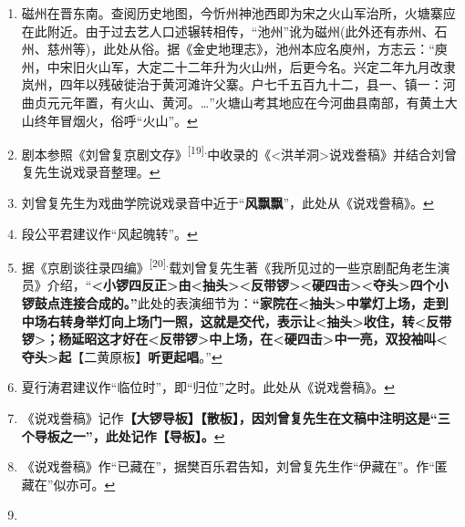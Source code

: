 \begin{enumerate}
  \protect\hyperlink{fnref469}{↩}
\item
  \leavevmode\hypertarget{fn470}{}%
  磁州在晋东南。查阅历史地图，今忻州神池西即为宋之火山军治所，火塘寨应在此附近。由于过去艺人口述辗转相传，``池州''讹为磁州(此外还有赤州、石州、慈州等)，此处从俗。据《金史地理志》，池州本应名庾州，方志云：``庾州，中宋旧火山军，大定二十二年升为火山州，后更今名。兴定二年九月改隶岚州，四年以残破徙治于黄河滩许父寨。户七千五百九十二，县一、镇一：河曲贞元元年置，有火山、黄河。\ldots{}''火塘山考其地应在今河曲县南部，有黄土大山终年冒烟火，俗呼``火山''。\protect\hyperlink{fnref470}{↩}
\item
  \leavevmode\hypertarget{fn471}{}%
  剧本参照《刘曾复京剧文存》\textsuperscript{{[}19{]}.}中收录的《\textless{}洪羊洞\textgreater{}说戏誊稿》并结合刘曾复先生说戏录音整理。\protect\hyperlink{fnref471}{↩}
\item
  \leavevmode\hypertarget{fn472}{}%
  刘曾复先生为戏曲学院说戏录音中近于``\textbf{风飘飘}''，此处从《说戏誊稿》。\protect\hyperlink{fnref472}{↩}
\item
  \leavevmode\hypertarget{fn473}{}%
  段公平君建议作``风起魄转''。\protect\hyperlink{fnref473}{↩}
\item
  \leavevmode\hypertarget{fn474}{}%
  据《京剧谈往录四编》\textsuperscript{{[}20{]}.}载刘曾复先生著《我所见过的一些京剧配角老生演员》介绍，``\textbf{\textless{}小锣四反正\textgreater{}由\textless{}抽头\textgreater{}\textless{}反带锣\textgreater{}\textless{}硬四击\textgreater{}\textless{}夺头\textgreater{}四个小锣鼓点连接合成的。''}此处的表演细节为：\textbf{``家院在\textless{}抽头\textgreater{}中掌灯上场，走到中场右转身举灯向上场门一照，这就是交代，表示让\textless{}抽头\textgreater{}收住，转\textless{}反带锣\textgreater{}；杨延昭这才好在\textless{}反带锣\textgreater{}中上场，在\textless{}硬四击\textgreater{}中一亮，双投袖叫\textless{}夺头\textgreater{}起}【二黄原板】\textbf{听更起唱}。''\protect\hyperlink{fnref474}{↩}
\item
  \leavevmode\hypertarget{fn475}{}%
  夏行涛君建议作``临位时''，即``归位''之时。此处从《说戏誊稿》。\protect\hyperlink{fnref475}{↩}
\item
  \leavevmode\hypertarget{fn476}{}%
  《说戏誊稿》记作\textbf{【大锣导板】【散板】，因刘曾复先生在文稿中注明这是``三个导板之一''，此处记作【导板】。}\protect\hyperlink{fnref476}{↩}
\item
  \leavevmode\hypertarget{fn477}{}%
  《说戏誊稿》作``已藏在''，据樊百乐君告知，刘曾复先生作``伊藏在''。作``匿藏在''似亦可。\protect\hyperlink{fnref477}{↩}
\item

\end{enumerate}
